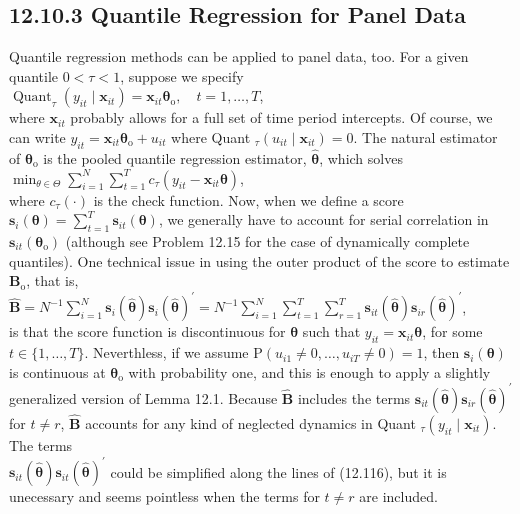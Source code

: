 \documentclass[10pt]{article}
\begin{document}
\subsection*{12.10.3 Quantile Regression for Panel Data}
Quantile regression methods can be applied to panel data, too. For a given quantile $0<\tau<1$, suppose we specify\\
$\operatorname{Quant}_{\tau}\left(y_{i t} \mid \mathbf{x}_{i t}\right)=\mathbf{x}_{i t} \boldsymbol{\theta}_{\mathrm{o}}, \quad t=1, \ldots, T$,\\
where $\mathbf{x}_{i t}$ probably allows for a full set of time period intercepts. Of course, we can write $y_{i t}=\mathbf{x}_{i t} \boldsymbol{\theta}_{\mathrm{o}}+u_{i t}$ where Quant $_{\tau}\left(u_{i t} \mid \mathbf{x}_{i t}\right)=0$. The natural estimator of $\boldsymbol{\theta}_{\mathrm{o}}$ is the pooled quantile regression estimator, $\hat{\boldsymbol{\theta}}$, which solves\\
$\min _{\theta \in \Theta} \sum_{i=1}^{N} \sum_{t=1}^{T} c_{\tau}\left(y_{i t}-\mathbf{x}_{i t} \boldsymbol{\theta}\right)$,\\
where $c_{\tau}(\cdot)$ is the check function. Now, when we define a score $\mathbf{s}_{i}(\boldsymbol{\theta})=\sum_{t=1}^{T} \mathbf{s}_{i t}(\boldsymbol{\theta})$, we generally have to account for serial correlation in $\mathbf{s}_{i t}\left(\boldsymbol{\theta}_{\mathrm{o}}\right)$ (although see Problem 12.15 for the case of dynamically complete quantiles). One technical issue in using the outer product of the score to estimate $\mathbf{B}_{\mathrm{o}}$, that is,\\
$\hat{\mathbf{B}}=N^{-1} \sum_{i=1}^{N} \mathbf{s}_{i}(\hat{\boldsymbol{\theta}}) \mathbf{s}_{i}(\hat{\boldsymbol{\theta}})^{\prime}=N^{-1} \sum_{i=1}^{N} \sum_{t=1}^{T} \sum_{r=1}^{T} \mathbf{s}_{i t}(\hat{\boldsymbol{\theta}}) \mathbf{s}_{i r}(\hat{\boldsymbol{\theta}})^{\prime}$,\\
is that the score function is discontinuous for $\boldsymbol{\theta}$ such that $y_{i t}=\mathbf{x}_{i t} \boldsymbol{\theta}$, for some $t \in\{1, \ldots, T\}$. Neverthless, if we assume $\mathrm{P}\left(u_{i 1} \neq 0, \ldots, u_{i T} \neq 0\right)=1$, then $\mathbf{s}_{i}(\boldsymbol{\theta})$ is continuous at $\boldsymbol{\theta}_{\mathrm{o}}$ with probability one, and this is enough to apply a slightly generalized version of Lemma 12.1. Because $\hat{\mathbf{B}}$ includes the terms $\mathbf{s}_{i t}(\hat{\boldsymbol{\theta}}) \mathbf{s}_{i r}(\hat{\boldsymbol{\theta}})^{\prime}$ for $t \neq r$, $\hat{\mathbf{B}}$ accounts for any kind of neglected dynamics in Quant $_{\tau}\left(y_{i t} \mid \mathbf{x}_{i t}\right)$. The terms\\
$\mathbf{s}_{i t}(\hat{\boldsymbol{\theta}}) \mathbf{s}_{i t}(\hat{\boldsymbol{\theta}})^{\prime}$ could be simplified along the lines of (12.116), but it is unecessary and seems pointless when the terms for $t \neq r$ are included.
\end{document}
